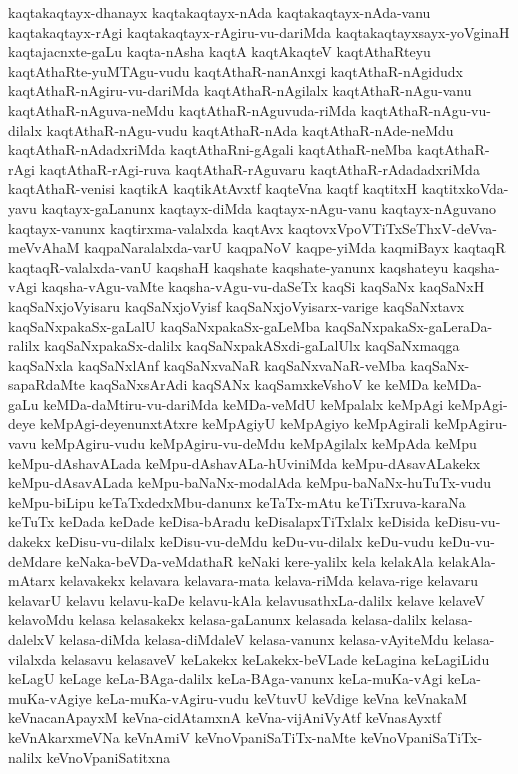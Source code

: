 {kaqtakaqtayx-dhanayx
kaqtakaqtayx-nAda
kaqtakaqtayx-nAda-vanu
kaqtakaqtayx-rAgi
kaqtakaqtayx-rAgiru-vu-dariMda
kaqtakaqtayxsayx-yoVginaH
kaqtajacnxte-gaLu
kaqta-nAsha
kaqtA
kaqtAkaqteV
kaqtAthaRteyu
kaqtAthaRte-yuMTAgu-vudu
kaqtAthaR-nanAnxgi
kaqtAthaR-nAgidudx
kaqtAthaR-nAgiru-vu-dariMda
kaqtAthaR-nAgilalx
kaqtAthaR-nAgu-vanu
kaqtAthaR-nAguva-neMdu
kaqtAthaR-nAguvuda-riMda
kaqtAthaR-nAgu-vu-dilalx
kaqtAthaR-nAgu-vudu
kaqtAthaR-nAda
kaqtAthaR-nAde-neMdu
kaqtAthaR-nAdadxriMda
kaqtAthaRni-gAgali
kaqtAthaR-neMba
kaqtAthaR-rAgi
kaqtAthaR-rAgi-ruva
kaqtAthaR-rAguvaru
kaqtAthaR-rAdadadxriMda
kaqtAthaR-venisi
kaqtikA
kaqtikAtAvxtf
kaqteVna
kaqtf
kaqtitxH
kaqtitxkoVda-yavu
kaqtayx-gaLanunx
kaqtayx-diMda
kaqtayx-nAgu-vanu
kaqtayx-nAguvano
kaqtayx-vanunx
kaqtirxma-valalxda
kaqtAvx
kaqtovxVpoVTiTxSeThxV-deVva-meVvAhaM
kaqpaNaralalxda-varU
kaqpaNoV
kaqpe-yiMda
kaqmiBayx
kaqtaqR
kaqtaqR-valalxda-vanU
kaqshaH
kaqshate
kaqshate-yanunx
kaqshateyu
kaqsha-vAgi
kaqsha-vAgu-vaMte
kaqsha-vAgu-vu-daSeTx
kaqSi
kaqSaNx
kaqSaNxH
kaqSaNxjoVyisaru
kaqSaNxjoVyisf
kaqSaNxjoVyisarx-varige
kaqSaNxtavx
kaqSaNxpakaSx-gaLalU
kaqSaNxpakaSx-gaLeMba
kaqSaNxpakaSx-gaLeraDa-ralilx
kaqSaNxpakaSx-dalilx
kaqSaNxpakASxdi-gaLalUlx
kaqSaNxmaqga
kaqSaNxla
kaqSaNxlAnf
kaqSaNxvaNaR
kaqSaNxvaNaR-veMba
kaqSaNx-sapaRdaMte
kaqSaNxsArAdi
kaqSANx
kaqSamxkeVshoV
ke
keMDa
keMDa-gaLu
keMDa-daMtiru-vu-dariMda
keMDa-veMdU
keMpalalx
keMpAgi
keMpAgi-deye
keMpAgi-deyenunxtAtxre
keMpAgiyU
keMpAgiyo
keMpAgirali
keMpAgiru-vavu
keMpAgiru-vudu
keMpAgiru-vu-deMdu
keMpAgilalx
keMpAda
keMpu
keMpu-dAshavALada
keMpu-dAshavALa-hUviniMda
keMpu-dAsavALakekx
keMpu-dAsavALada
keMpu-baNaNx-modalAda
keMpu-baNaNx-huTuTx-vudu
keMpu-biLipu
keTaTxdedxMbu-danunx
keTaTx-mAtu
keTiTxruva-karaNa
keTuTx
keDada
keDade
keDisa-bAradu
keDisalapxTiTxlalx
keDisida
keDisu-vu-dakekx
keDisu-vu-dilalx
keDisu-vu-deMdu
keDu-vu-dilalx
keDu-vudu
keDu-vu-deMdare
keNaka-beVDa-veMdathaR
keNaki
kere-yalilx
kela
kelakAla
kelakAla-mAtarx
kelavakekx
kelavara
kelavara-mata
kelava-riMda
kelava-rige
kelavaru
kelavarU
kelavu
kelavu-kaDe
kelavu-kAla
kelavusathxLa-dalilx
kelave
kelaveV
kelavoMdu
kelasa
kelasakekx
kelasa-gaLanunx
kelasada
kelasa-dalilx
kelasa-dalelxV
kelasa-diMda
kelasa-diMdaleV
kelasa-vanunx
kelasa-vAyiteMdu
kelasa-vilalxda
kelasavu
kelasaveV
keLakekx
keLakekx-beVLade
keLagina
keLagiLidu
keLagU
keLage
keLa-BAga-dalilx
keLa-BAga-vanunx
keLa-muKa-vAgi
keLa-muKa-vAgiye
keLa-muKa-vAgiru-vudu
keVtuvU
keVdige
keVna
keVnakaM
keVnacanApayxM
keVna-cidAtamxnA
keVna-vijAniVyAtf
keVnasAyxtf
keVnAkarxmeVNa
keVnAmiV
keVnoVpaniSaTiTx-naMte
keVnoVpaniSaTiTx-nalilx
keVnoVpaniSatitxna
}

